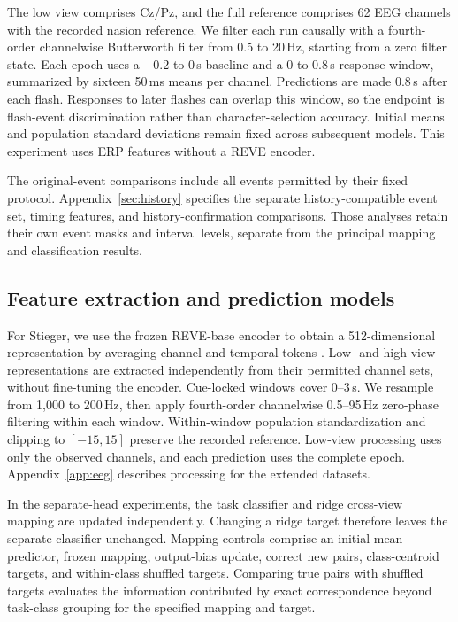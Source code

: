 \documentclass[11pt,a4paper]{article}
\begin{document}
The low view comprises Cz/Pz, and the full reference comprises 62 EEG channels with the recorded nasion reference. We filter each run causally with a fourth-order channelwise Butterworth filter from 0.5 to 20\,Hz, starting from a zero filter state. Each epoch uses a $-0.2$ to 0\,s baseline and a 0 to 0.8\,s response window, summarized by sixteen 50\,ms means per channel. Predictions are made 0.8\,s after each flash. Responses to later flashes can overlap this window, so the endpoint is flash-event discrimination rather than character-selection accuracy. Initial means and population standard deviations remain fixed across subsequent models. This experiment uses ERP features without a REVE encoder.

The original-event comparisons include all events permitted by their fixed protocol. Appendix~\ref{sec:history} specifies the separate history-compatible event set, timing features, and history-confirmation comparisons. Those analyses retain their own event masks and interval levels, separate from the principal mapping and classification results.

\subsection{Feature extraction and prediction models}

For Stieger, we use the frozen REVE-base encoder to obtain a 512-dimensional representation by averaging channel and temporal tokens \cite{reve2025}. Low- and high-view representations are extracted independently from their permitted channel sets, without fine-tuning the encoder. Cue-locked windows cover 0--3\,s. We resample from 1,000 to 200\,Hz, then apply fourth-order channelwise 0.5--95\,Hz zero-phase filtering within each window. Within-window population standardization and clipping to $[-15,15]$ preserve the recorded reference. Low-view processing uses only the observed channels, and each prediction uses the complete epoch. Appendix~\ref{app:eeg} describes processing for the extended datasets.

In the separate-head experiments, the task classifier and ridge cross-view mapping are updated independently. Changing a ridge target therefore leaves the separate classifier unchanged. Mapping controls comprise an initial-mean predictor, frozen mapping, output-bias update, correct new pairs, class-centroid targets, and within-class shuffled targets. Comparing true pairs with shuffled targets evaluates the information contributed by exact correspondence beyond task-class grouping for the specified mapping and target.
\end{document}
